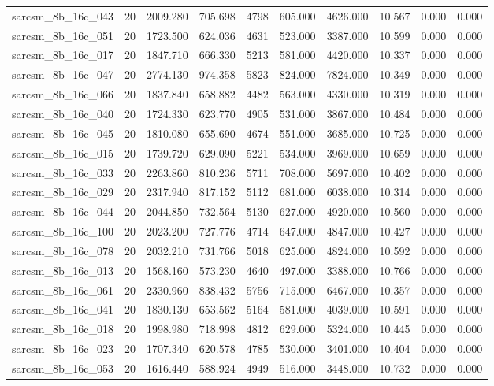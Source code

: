 \begin{tabular}{lrrrrrrrrr}
sarcsm\_8b\_16c\_043 & 20 & 2009.280 & 705.698 & 4798 & 605.000 & 4626.000 & 10.567 & 0.000 & 0.000 \\
sarcsm\_8b\_16c\_051 & 20 & 1723.500 & 624.036 & 4631 & 523.000 & 3387.000 & 10.599 & 0.000 & 0.000 \\
sarcsm\_8b\_16c\_017 & 20 & 1847.710 & 666.330 & 5213 & 581.000 & 4420.000 & 10.337 & 0.000 & 0.000 \\
sarcsm\_8b\_16c\_047 & 20 & 2774.130 & 974.358 & 5823 & 824.000 & 7824.000 & 10.349 & 0.000 & 0.000 \\
sarcsm\_8b\_16c\_066 & 20 & 1837.840 & 658.882 & 4482 & 563.000 & 4330.000 & 10.319 & 0.000 & 0.000 \\
sarcsm\_8b\_16c\_040 & 20 & 1724.330 & 623.770 & 4905 & 531.000 & 3867.000 & 10.484 & 0.000 & 0.000 \\
sarcsm\_8b\_16c\_045 & 20 & 1810.080 & 655.690 & 4674 & 551.000 & 3685.000 & 10.725 & 0.000 & 0.000 \\
sarcsm\_8b\_16c\_015 & 20 & 1739.720 & 629.090 & 5221 & 534.000 & 3969.000 & 10.659 & 0.000 & 0.000 \\
sarcsm\_8b\_16c\_033 & 20 & 2263.860 & 810.236 & 5711 & 708.000 & 5697.000 & 10.402 & 0.000 & 0.000 \\
sarcsm\_8b\_16c\_029 & 20 & 2317.940 & 817.152 & 5112 & 681.000 & 6038.000 & 10.314 & 0.000 & 0.000 \\
sarcsm\_8b\_16c\_044 & 20 & 2044.850 & 732.564 & 5130 & 627.000 & 4920.000 & 10.560 & 0.000 & 0.000 \\
sarcsm\_8b\_16c\_100 & 20 & 2023.200 & 727.776 & 4714 & 647.000 & 4847.000 & 10.427 & 0.000 & 0.000 \\
sarcsm\_8b\_16c\_078 & 20 & 2032.210 & 731.766 & 5018 & 625.000 & 4824.000 & 10.592 & 0.000 & 0.000 \\
sarcsm\_8b\_16c\_013 & 20 & 1568.160 & 573.230 & 4640 & 497.000 & 3388.000 & 10.766 & 0.000 & 0.000 \\
sarcsm\_8b\_16c\_061 & 20 & 2330.960 & 838.432 & 5756 & 715.000 & 6467.000 & 10.357 & 0.000 & 0.000 \\
sarcsm\_8b\_16c\_041 & 20 & 1830.130 & 653.562 & 5164 & 581.000 & 4039.000 & 10.591 & 0.000 & 0.000 \\
sarcsm\_8b\_16c\_018 & 20 & 1998.980 & 718.998 & 4812 & 629.000 & 5324.000 & 10.445 & 0.000 & 0.000 \\
sarcsm\_8b\_16c\_023 & 20 & 1707.340 & 620.578 & 4785 & 530.000 & 3401.000 & 10.404 & 0.000 & 0.000 \\
sarcsm\_8b\_16c\_053 & 20 & 1616.440 & 588.924 & 4949 & 516.000 & 3448.000 & 10.732 & 0.000 & 0.000 \\

\end{tabular}

